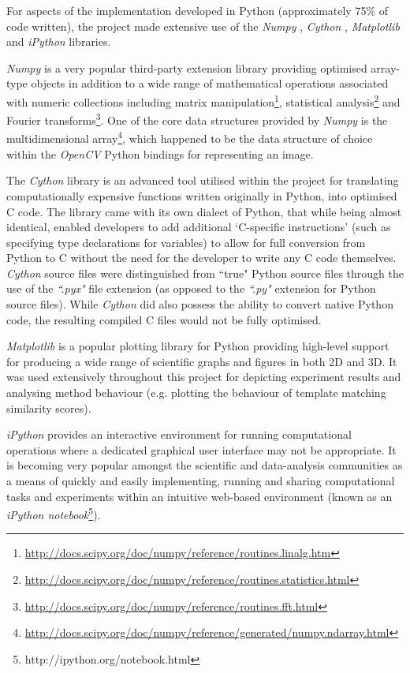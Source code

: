For aspects of the implementation developed in Python (approximately 75\% of code written), the project made extensive use of the \textit{Numpy} \cite{numpy}, \textit{Cython} \cite{cython}, \textit{Matplotlib} \cite{matplotlib} and \textit{iPython} \cite{ipython} libraries. 

\textit{Numpy} \cite{numpy} is a very popular third-party extension library providing optimised array-type objects in addition to a wide range of mathematical operations associated with numeric collections including matrix manipulation\footnote{\url{http://docs.scipy.org/doc/numpy/reference/routines.linalg.htm}}, statistical analysis\footnote{\url{http://docs.scipy.org/doc/numpy/reference/routines.statistics.html}} and Fourier transforms\footnote{\url{http://docs.scipy.org/doc/numpy/reference/routines.fft.html}}. One of the core data structures provided by \textit{Numpy} is the multidimensional array\footnote{\url{http://docs.scipy.org/doc/numpy/reference/generated/numpy.ndarray.html}}, which happened to be the data structure of choice within the \textit{OpenCV} Python bindings for representing an image.

The \textit{Cython} library \cite{cython} is an advanced tool utilised within the project for translating computationally expensive functions written originally in Python, into optimised C code. The library came with its own dialect of Python, that while being almost identical, enabled developers to add additional `C-specific instructions' (such as specifying type declarations for variables) to allow for full conversion from Python to C without the need for the developer to write any C code themselves. \textit{Cython} source files were distinguished from ``true" Python source files through the use of the \textit{``.pyx"} file extension (as opposed to the \textit{``.py"} extension for Python source files). While \textit{Cython} did also possess the ability to convert native Python code, the resulting compiled C files would not be fully optimised.

\textit{Matplotlib} \cite{matplotlib} is a popular plotting library for Python providing high-level support for producing a wide range of scientific graphs and figures in both 2D and 3D. It was used extensively throughout this project for depicting experiment results and analysing method behaviour (e.g. plotting the behaviour of template matching similarity scores).

\textit{iPython} \cite{ipython} provides an interactive environment for running computational operations where a dedicated graphical user interface may not be appropriate. It is becoming very popular amongst the scientific and data-analysis communities as a means of quickly and easily implementing, running and sharing computational tasks and experiments within an intuitive web-based environment (known as an \textit{iPython notebook}\footnote{http://ipython.org/notebook.html}).
 
